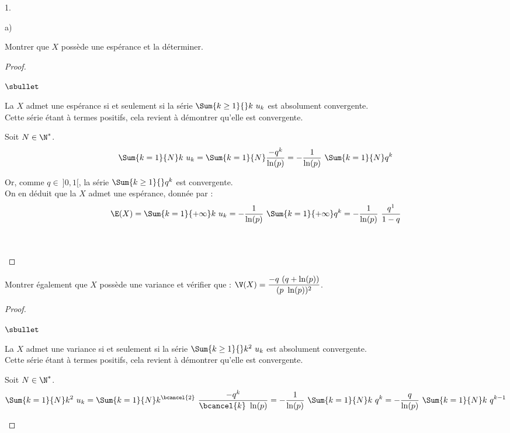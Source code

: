 \documentclass[11pt]{article}%
\begin{document}
\begin{noliste}{1.}
\item
  \begin{noliste}{a)}
    \setlength{\itemsep}{2mm}
  \item Montrer que $X$ possède une espérance et la déterminer.

    \begin{proof}~%
      \begin{noliste}{$\sbullet$}
      \item La \var $X$ admet une espérance si et seulement si la
        série $\Sum{k \geq 1}{} k \ u_k$ est absolument convergente.\\
        Cette série étant à termes positifs, cela revient à démontrer
        qu'elle est convergente.

      \item Soit $N \in \N^*$.
        \[
        \Sum{k = 1}{N} k \ u_k = \Sum{k = 1}{N} \dfrac{-q^k}{\ln(p)} =
        -\dfrac{1}{\ln(p)} \ \Sum{k = 1}{N} q^k
        \]

      \item Or, comme $q \in \ ]0, 1[$, la série $\Sum{k \geq 1}{}
        q^k$ est convergente.\\
        On en déduit que la \var $X$ admet une espérance, donnée par : 
        \[
        \E(X) = \Sum{k=1}{+\infty} k \ u_k = -\dfrac{1}{\ln(p)}
        \ \Sum{k=1}{+\infty} q^k = -\dfrac{1}{\ln(p)} \ \dfrac{q^1}{1-q}
        \]
      \end{noliste}
      ~\\[-1.1cm]
      ~\\[-1.2cm]
    \end{proof}




  \item Montrer également que $X$ possède une variance et vérifier que
    : $\V(X) = \dfrac{-q \ (q + \ln(p))}{(p \ \ln(p))^{2}}$.

    \begin{proof}~%
      \begin{noliste}{$\sbullet$}
      \item La \var $X$ admet une variance si et seulement si la
        série $\Sum{k \geq 1}{} k^2 \ u_k$ est absolument convergente.\\
        Cette série étant à termes positifs, cela revient à démontrer
        qu'elle est convergente.

      \item Soit $N \in \N^*$.
        \[
        \Sum{k = 1}{N} k^2 \ u_k = \Sum{k = 1}{N} k^{\bcancel{2}} \
        \dfrac{-q^k}{\bcancel{k} \ \ln(p)} = -\dfrac{1}{\ln(p)} \
        \Sum{k = 1}{N} k \ q^k = -\dfrac{q}{\ln(p)} \ \Sum{k = 1}{N} k
        \ q^{k-1}
        \]


\end{noliste}
\end{proof}
\end{noliste}
\end{noliste}
\end{document}
